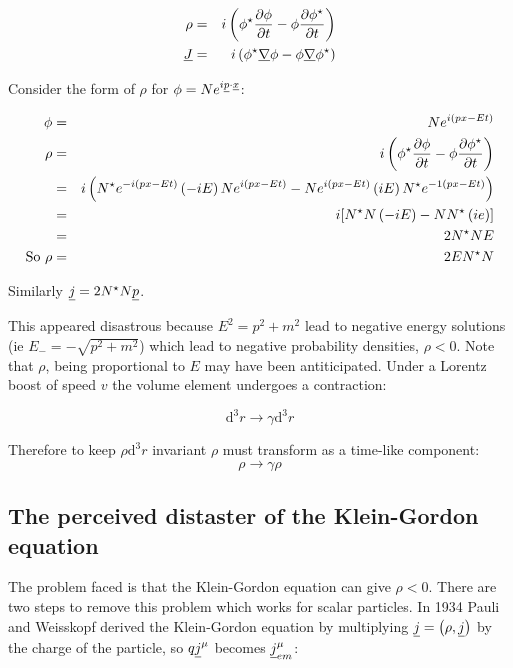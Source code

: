 \begin{eqnarray*}
  \rho & = & i\left(\phi^{\star}\frac{\partial\phi}{\partial t} - \phi\frac{\partial \phi^{\star}}{\partial t} \right) \\
  \underline{J} & = & i\left( \phi^{\star}\underline{\nabla}\phi - \phi\underline{\nabla}\phi^{\star}\right) 
\end{eqnarray*}

Consider the form of $\rho$ for $\phi = Ne^{i\underline{p}\cdot{\underline{x}}}$:

\begin{eqnarray*}
  \phi & = & Ne^{i\left(px - Et\right)} \\
  \rho & = & i\left(\phi^{\star}\frac{\partial \phi}{\partial t} - \phi \frac{\partial \phi^{\star}}{\partial t}\right) \\
  & = & i \left( N^{\star}e^{-i\left(px-Et\right)}\left(-iE\right)Ne^{i\left(px-Et\right)} - Ne^{i\left(px-Et\right)}\left(iE\right)N^{\star}e^{-1\left(px-Et\right)}\right) \\
  & = & i\lbrack N^{\star}N\left(-iE\right) - NN^{\star}\left(ie\right) \rbrack \\
  & = & 2N^{\star}NE \\
  \textrm{So } \rho & = & 2EN^{\star}N
\end{eqnarray*}

Similarly $\underline{j} = 2N^{\star}N\underline{p}$.

This appeared disastrous because $E^2 = p^2 + m^2$ lead to negative energy solutions (ie $E_- = -\sqrt{p^2 + m^2}$) which lead to negative probability densities, $\rho<0$.  Note that $\rho$, being proportional to $E$ may have been antiticipated.  Under a Lorentz boost of speed $v$ the volume element undergoes a contraction:

\[
  \mathrm{d}^3r \to \gamma\mathrm{d}^3r
\]

Therefore to keep $\rho \mathrm{d}^3r$ invariant $\rho$ must transform as a time-like component:
\[
  \rho \to \gamma \rho
\]

\subsection{The perceived distaster of the Klein-Gordon equation}

The problem faced is that the Klein-Gordon equation can give $\rho<0$.  There are two steps to remove this problem which works for scalar particles.  In 1934 Pauli and Weisskopf derived the Klein-Gordon equation by multiplying $\underline{j} = \left(\rho, \underline{j}\right)$ by the charge of the particle, so $q\underline{j}^{\mu}$ becomes $\underline{j}^{\mu}_{em}$:


